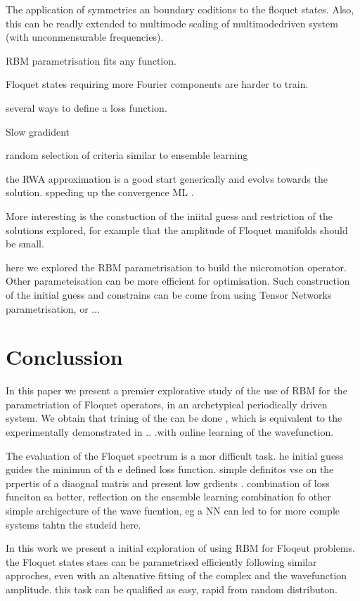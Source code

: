 \documentclass[pra,twocolumn,showkeys,preprintnumbers, amsmath,amssymb, aps,A4paper]{revtex4-1}
\begin{document}
\begin{equaiton}
\begin{equaiton}
The application of symmetries an boundary coditions to the floquet states. Also, this can be readly extended to multimode scaling of multimodedriven system (with unconmensurable frequencies).
 


RBM parametrisation fits any function.

Floquet states requiring more Fourier components are harder to train.

several ways to define a loss function.

Slow gradident

random selection of criteria similar to ensemble learning

the RWA approximation is a good start generically and evolvs towards the solution. sppeding up the  convergence ML .

More interesting is the constuction of the iniital guess and restriction of the solutions explored, for example that the amplitude of Floquet manifolds should be small.

here we explored the RBM parametrisation to build the micromotion operator. Other parameteisation  can be more efficient for optimisation. Such construction of the initial guess and constrains can be come from using Tensor Networks parametrisation, or ... 


\section{Conclussion}
In this paper we present a premier explorative study of the use of RBM for the parametriation of Floquet operators, in an archetypical periodically driven system. We obtain that trining of the can be done , which is equivalent to the experimentally demonstrated in .. .with online learning of the wavefunction.

The evaluation of the Floquet spectrum is a mor difficult task. he initial guess guides the minimun of th e defined loss function. simple definitos vse on the prpertis of a diaognal matris and present low grdients .  combination of loss funciton sa better, reflection on the ensemble learning combination fo other simple archigecture of the wave fucntion, eg a NN can led to for more comple systems tahtn the studeid here. 

In this work we present a initial exploration of using RBM for Floqeut problems. the Floquet states staes can be parametrised efficiently following similar approches, even with an altenative fitting of the complex and the wavefunction amplitude. this task can be qualified as easy, rapid from random distributon. 


\end{equaiton}
\end{equaiton}
\end{document}
